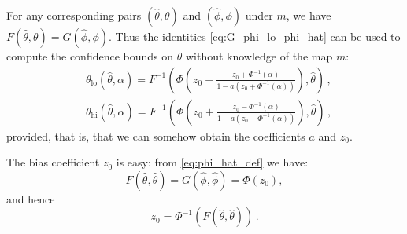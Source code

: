 \documentclass{article}
\begin{document}
For any corresponding pairs $(\hat \theta, \theta)$ and $(\hat \phi, \phi)$
under $m$, we have $F(\hat\theta, \theta) = G(\hat \phi, \phi)$. Thus the
identities \eqref{eq:G_phi_lo_phi_hat} can be used to compute
the confidence bounds on $\theta$ without knowledge of the map $m$: 
\begin{equation}
\begin{aligned}
&\theta_\mathrm{lo}(\hat \theta, \alpha) =
    F^{-1}\left(\Phi\left(z_0 + \frac{z_0 + \Phi^{-1}(\alpha)}
                         {1 - a \left (z_0 + \Phi^{-1}(\alpha) \right)}
        \right), \hat \theta \right)\,, \\
&\theta_\mathrm{hi}(\hat \theta, \alpha) =
    F^{-1}\left(\Phi\left(z_0 + \frac{z_0 - \Phi^{-1}(\alpha)}
                         {1 - a \left (z_0 - \Phi^{-1}(\alpha) \right)}
        \right), \hat \theta \right)\,,
\end{aligned}
\end{equation}
provided, that is, that we can somehow obtain the coefficients $a$ and $z_0$.

The bias coefficient $z_0$ is easy: from \eqref{eq:phi_hat_def} we have:
\begin{equation}
    F(\hat \theta, \hat \theta) = G(\hat \phi, \hat \phi) = \Phi(z_0),
\end{equation}
and hence
\begin{equation}
    z_0 = \Phi^{-1}\left(F(\hat \theta, \hat \theta)\right)\,.
\end{equation}
\end{document}
